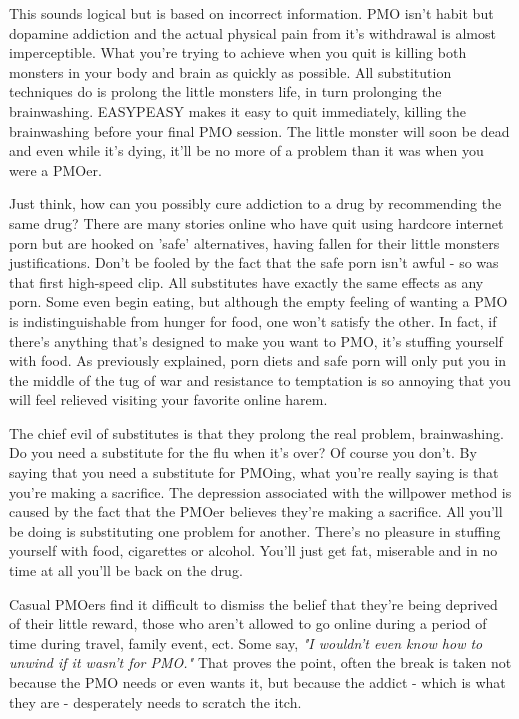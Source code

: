 \documentclass[easypeasy.tex]{subfiles}
\begin{document}
This sounds logical but is based on incorrect information. PMO isn't habit but dopamine addiction and the actual physical pain from it's withdrawal is almost imperceptible. What you're trying to achieve when you quit is killing both monsters in your body and brain as quickly as possible. All substitution techniques do is prolong the little monsters life, in turn prolonging the brainwashing. EASYPEASY makes it easy to quit immediately, killing the brainwashing before your final PMO session. The little monster will soon be dead and even while it's dying, it'll be no more of a problem than it was when you were a PMOer.

Just think, how can you possibly cure addiction to a drug by recommending the same drug? There are many stories online who have quit using hardcore internet porn but are hooked on 'safe' alternatives, having fallen for their little monsters justifications. Don't be fooled by the fact that the safe porn isn't awful - so was that first high-speed clip. All substitutes have exactly the same effects as any porn. Some even begin eating, but although the empty feeling of wanting a PMO is indistinguishable from hunger for food, one won't satisfy the other. In fact, if there's anything that's designed to make you want to PMO, it's stuffing yourself with food. As previously explained, porn diets and safe porn will only put you in the middle of the tug of war and resistance to temptation is so annoying that you will feel relieved visiting your favorite online harem.

The chief evil of substitutes is that they prolong the real problem, brainwashing. Do you need a substitute for the flu when it's over? Of course you don't. By saying that you need a substitute for PMOing, what you're really saying is that you're making a sacrifice. The depression associated with the willpower method is caused by the fact that the PMOer believes they're making a sacrifice. All you'll be doing is substituting one problem for another. There's no pleasure in stuffing yourself with food, cigarettes or alcohol. You'll just get fat, miserable and in no time at all you'll be back on the drug.

Casual PMOers find it difficult to dismiss the belief that they're being deprived of their little reward, those who aren't allowed to go online during a period of time during travel, family event, ect. Some say, \textit{"I wouldn't even know how to unwind if it wasn't for PMO."} That proves the point, often the break is taken not because the PMO needs or even wants it, but because the addict - which is what they are - desperately needs to scratch the itch.
\end{document}
